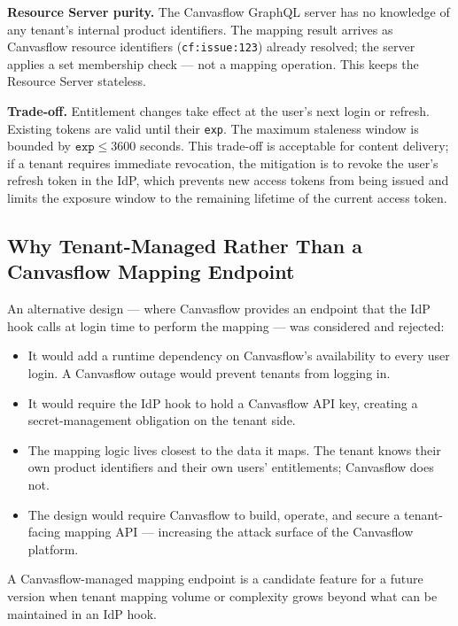 \textbf{Resource Server purity.} The Canvasflow GraphQL server has no knowledge of any
tenant's internal product identifiers. The mapping result arrives as Canvasflow resource
identifiers (\texttt{cf:issue:123}) already resolved; the server applies a set membership
check --- not a mapping operation. This keeps the Resource Server stateless.

\textbf{Trade-off.} Entitlement changes take effect at the user's next login or refresh.
Existing tokens are valid until their \texttt{exp}. The maximum staleness window is
bounded by $\texttt{exp} \le 3600$ seconds. This trade-off is acceptable for
content delivery; if a tenant requires immediate revocation, the mitigation is to revoke
the user's refresh token in the IdP, which prevents new access tokens from being issued
and limits the exposure window to the remaining lifetime of the current access token.

\subsection{Why Tenant-Managed Rather Than a Canvasflow Mapping Endpoint}

An alternative design --- where Canvasflow provides an endpoint that the IdP hook calls
at login time to perform the mapping --- was considered and rejected:

\begin{itemize}
  \item It would add a runtime dependency on Canvasflow's availability to every user
    login. A Canvasflow outage would prevent tenants from logging in.
  \item It would require the IdP hook to hold a Canvasflow API key, creating a
    secret-management obligation on the tenant side.
  \item The mapping logic lives closest to the data it maps. The tenant knows their own
    product identifiers and their own users' entitlements; Canvasflow does not.
  \item The design would require Canvasflow to build, operate, and secure a
    tenant-facing mapping API --- increasing the attack surface of the Canvasflow
    platform.
\end{itemize}

A Canvasflow-managed mapping endpoint is a candidate feature for a future version when
tenant mapping volume or complexity grows beyond what can be maintained in an IdP hook.

